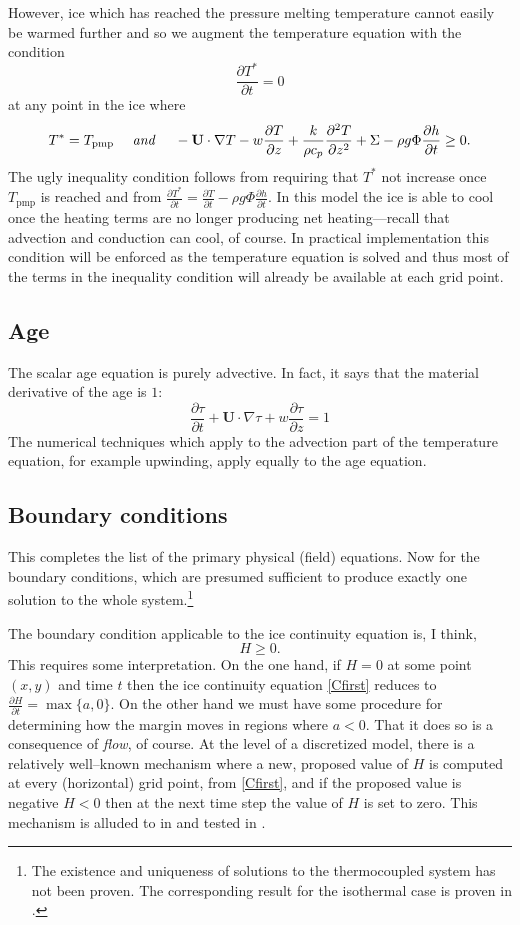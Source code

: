 \documentclass{amsart}%
\theoremstyle{plain}
\theoremstyle{definition}
\theoremstyle{remark}
\newcommand{\ddt}[1]{\ensuremath{\frac{\partial #1}{\partial t}}}
\newcommand{\ddz}[1]{\ensuremath{\frac{\partial #1}{\partial z}}}
\newcommand{\dddzdz}[1]{\ensuremath{\frac{\partial^2 #1}{\partial z^2}}}
\newcommand{\grad}{\nabla}
\newcommand{\Tpmp}{T_{\text{pmp}}}
\newcommand{\bU}{{\mathbf{U}}}
\begin{document}
However, ice which has reached the pressure melting temperature cannot easily be warmed further and so we augment the temperature equation with the condition
    $$\ddt{T^*}=0$$
at any point in the ice where
    $$T^*=\Tpmp \quad \text{ \emph{and} } \quad -\bU\cdot\grad T - w \ddz{T} + \frac{k}{\rho c_p} \dddzdz{T} + \Sigma - \rho g \Phi \ddt{h} \ge 0.$$
The ugly inequality condition follows from requiring that $T^*$ not increase once $\Tpmp$ is reached and from $\ddt{T^*}=\ddt{T}-\rho g \Phi \ddt{h}$.  In this model the ice is able to cool once the heating terms are no longer producing net heating---recall that advection and conduction can cool, of course.  In practical implementation this condition will be enforced as the temperature equation is solved and thus most of the terms in the inequality condition will already be available at each grid point.


\subsection{Age}  The scalar age equation is purely advective.  In fact, it says that the material derivative of the age is $1$:
\begin{equation}\label{ageeqn}
\ddt{\tau} + \bU\cdot \grad \tau + w \ddz{\tau} = 1
\end{equation}
The numerical techniques which apply to the advection part of the temperature equation, for example upwinding, apply equally to the age equation.


\subsection{Boundary conditions}  This completes the list of the primary physical (field) equations.  Now for the boundary conditions, which are presumed sufficient to produce exactly one solution to the whole system.\footnote{The existence and uniqueness of solutions to the thermocoupled system has not been proven.  The corresponding result for the isothermal case is proven in \cite{CDDSV}.}

The boundary condition applicable to the ice continuity equation is, I think,
    $$H\ge 0.$$
This requires some interpretation.  On the one hand, if $H=0$ at some point $(x,y)$ and time $t$ then the ice continuity equation \eqref{Cfirst} reduces to $\ddt{H} = \max\{a,0\}$.  On the other hand we must have some procedure for determining how the margin moves in regions where $a<0$.  That it does so is a consequence of \emph{flow}, of course.  At the level of a discretized model, there is a relatively well--known mechanism where a new, proposed value of $H$ is computed at every (horizontal) grid point, from \eqref{Cfirst}, and if the proposed value is negative $H<0$ then at the next time step the value of $H$ is set to zero.  This mechanism is alluded to in \cite{vanderVeen} and tested in \cite{BLKCB}.
\end{document}
